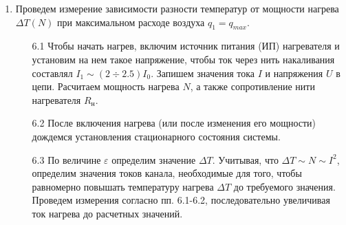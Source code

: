 \documentclass[12pt,a4paper]{article}
\begin{document}
\begin{enumerate}
    \item Проведем измерение зависимости разности температур от мощности нагрева $\Delta T(N)$ при максимальном расходе воздуха $q_1 = q_{max}$. 
    \begin{enumerate}
        \item[6.1] Чтобы начать нагрев, включим источник питания (ИП) нагревателя и установим на нем такое напряжение, чтобы ток через нить накаливания составлял $I_1 \sim (2 \div 2.5)I_0$. Запишем значения тока $I$ и напряжения $U$ в цепи. Расчитаем мощность нагрева $N$, а также сопротивление нити нагревателя $R_н$.
        \item[6.2] После включения нагрева (или после изменения его мощности) дождемся установления стационарного состояния системы.
        \item[6.3] По величине $\varepsilon$ определим значение $\Delta T$. Учитывая, что $\Delta T \sim N \sim I^2$, определим значения токов канала, необходимые для того, чтобы равномерно повышать температуру нагрева $\Delta T$ до требуемого значения. Проведем измерения согласно пп. 6.1-6.2, последовательно увеличивая ток нагрева до расчетных значений.
        

\end{enumerate}
\end{enumerate}
\end{document}
